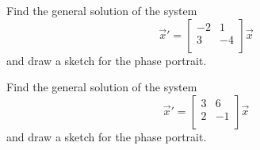 \begin{exercise}\ansMark%
Find the general solution of the system
\begin{equation*}
{\vec{x}}' = \begin{bmatrix}
-2 & 1 \\ 
3 & -4 \\ 
\end{bmatrix} \vec{x}
\end{equation*}
and draw a sketch for the phase portrait.
\end{exercise}
%


\begin{exercise}\ansMark%
Find the general solution of the system
\begin{equation*}
{\vec{x}}' =  \begin{bmatrix}
3 & 6 \\ 
2 & -1 \\ 
\end{bmatrix}\vec{x}
\end{equation*}
and draw a sketch for the phase portrait.
\end{exercise}
%


